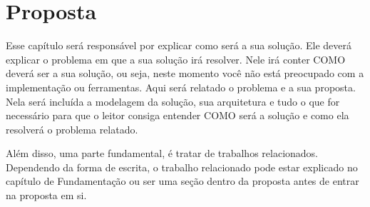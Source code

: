 \chapter{Proposta}\label{chp:PROPOSTA}

Esse capítulo será responsável por explicar como será a sua solução.
Ele deverá explicar o problema em que a sua solução irá resolver.
Nele irá conter COMO deverá ser a sua solução, ou seja, neste momento você não está preocupado com a implementação ou ferramentas.
Aqui será relatado o problema e a sua proposta. 
Nela será incluída a modelagem da solução, sua arquitetura e tudo o que for necessário para que o leitor consiga entender COMO será a solução e como ela resolverá o problema relatado.

Além disso, uma parte fundamental, é tratar de trabalhos relacionados. Dependendo da forma de escrita, o trabalho relacionado pode estar explicado no capítulo de Fundamentação ou ser uma seção dentro da proposta antes de entrar na proposta em si.